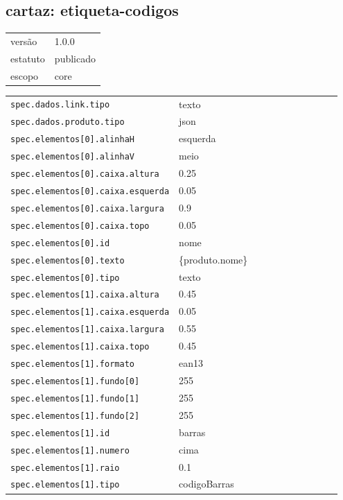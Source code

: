 \subsection*{cartaz: etiqueta-codigos}
\begin{tabular}{@{}ll@{}}
versão & 1.0.0 \\
estatuto & publicado \\
escopo & core \\
\end{tabular}

\begin{tabular}{@{}p{0.35\linewidth}p{0.6\linewidth}@{}}
\texttt{spec.dados.link.tipo} & texto \\
\texttt{spec.dados.produto.tipo} & json \\
\texttt{spec.elementos[0].alinhaH} & esquerda \\
\texttt{spec.elementos[0].alinhaV} & meio \\
\texttt{spec.elementos[0].caixa.altura} & 0.25 \\
\texttt{spec.elementos[0].caixa.esquerda} & 0.05 \\
\texttt{spec.elementos[0].caixa.largura} & 0.9 \\
\texttt{spec.elementos[0].caixa.topo} & 0.05 \\
\texttt{spec.elementos[0].id} & nome \\
\texttt{spec.elementos[0].texto} & \{produto.nome\} \\
\texttt{spec.elementos[0].tipo} & texto \\
\texttt{spec.elementos[1].caixa.altura} & 0.45 \\
\texttt{spec.elementos[1].caixa.esquerda} & 0.05 \\
\texttt{spec.elementos[1].caixa.largura} & 0.55 \\
\texttt{spec.elementos[1].caixa.topo} & 0.45 \\
\texttt{spec.elementos[1].formato} & ean13 \\
\texttt{spec.elementos[1].fundo[0]} & 255 \\
\texttt{spec.elementos[1].fundo[1]} & 255 \\
\texttt{spec.elementos[1].fundo[2]} & 255 \\
\texttt{spec.elementos[1].id} & barras \\
\texttt{spec.elementos[1].numero} & cima \\
\texttt{spec.elementos[1].raio} & 0.1 \\
\texttt{spec.elementos[1].tipo} & codigoBarras \\

\end{tabular}

